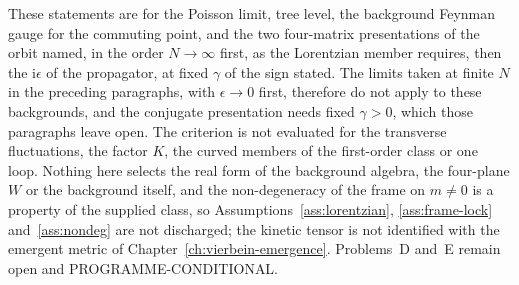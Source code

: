 These statements are for the Poisson limit, tree level, the background Feynman gauge for the commuting point, and the two four-matrix presentations of the orbit named, in the order \(N\to\infty\) first, as the Lorentzian member requires, then the \(\mathrm i\epsilon\) of the propagator, at fixed \(\gamma\) of the sign stated. The limits taken at finite \(N\) in the preceding paragraphs, with \(\epsilon\to0\) first, therefore do not apply to these backgrounds, and the conjugate presentation needs fixed \(\gamma>0\), which those paragraphs leave open. The criterion is not evaluated for the transverse fluctuations, the factor \(K\), the curved members of the first-order class or one loop. Nothing here selects the real form of the background algebra, the four-plane \(W\) or the background itself, and the non-degeneracy of the frame on \(m\neq0\) is a property of the supplied class, so Assumptions~\ref{ass:lorentzian}, \ref{ass:frame-lock} and~\ref{ass:nondeg} are not discharged; the kinetic tensor is not identified with the emergent metric of Chapter~\ref{ch:vierbein-emergence}. Problems~D and~E remain open and PROGRAMME-CONDITIONAL.

